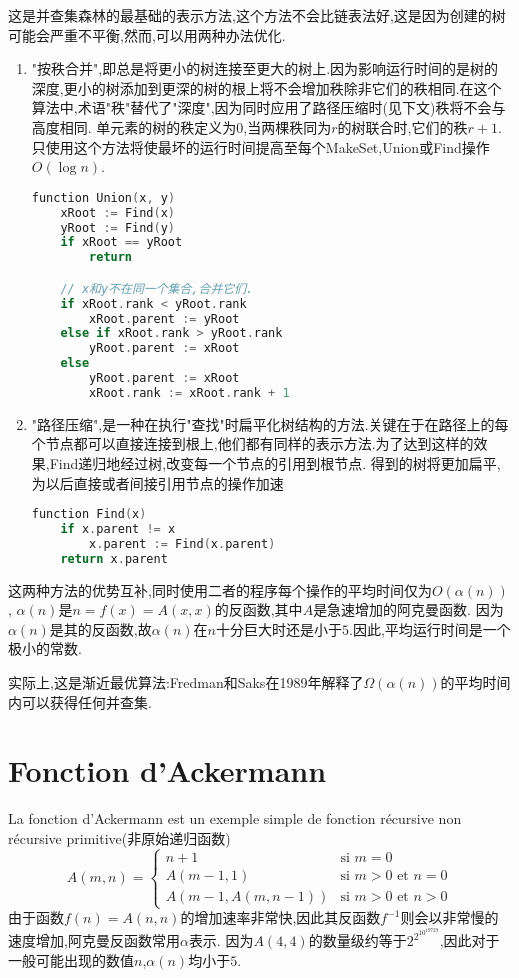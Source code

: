 这是并查集森林的最基础的表示方法,这个方法不会比链表法好,这是因为创建的树可能会严重不平衡,然而,可以用两种办法优化.
\begin{enumerate}
\item "按秩合并",即总是将更小的树连接至更大的树上.因为影响运行时间的是树的深度,更小的树添加到更深的树的根上将不会增加秩除非它们的秩相同.在这个算法中,术语"秩"替代了"深度",因为同时应用了路径压缩时(见下文)秩将不会与高度相同.
	单元素的树的秩定义为$0$,当两棵秩同为$r$的树联合时,它们的秩$r+1$.只使用这个方法将使最坏的运行时间提高至每个MakeSet,Union或Find操作 $O(\log n)$.
\begin{lstlisting}[language = C]
function Union(x, y)
	xRoot := Find(x)
	yRoot := Find(y)
	if xRoot == yRoot
		return

	// x和y不在同一个集合,合并它们.
	if xRoot.rank < yRoot.rank
		xRoot.parent := yRoot
	else if xRoot.rank > yRoot.rank
		yRoot.parent := xRoot
	else
		yRoot.parent := xRoot
		xRoot.rank := xRoot.rank + 1
\end{lstlisting}
\item "路径压缩",是一种在执行"查找"时扁平化树结构的方法.关键在于在路径上的每个节点都可以直接连接到根上,他们都有同样的表示方法.为了达到这样的效果,Find递归地经过树,改变每一个节点的引用到根节点.
	得到的树将更加扁平,为以后直接或者间接引用节点的操作加速
\begin{lstlisting}[language = C]
function Find(x)
	if x.parent != x
		x.parent := Find(x.parent)
	return x.parent
\end{lstlisting}
\end{enumerate}
这两种方法的优势互补,同时使用二者的程序每个操作的平均时间仅为$O(\alpha(n))$, $\alpha(n)$是$n = f(x) = A(x,x)$的反函数,其中$A$是急速增加的阿克曼函数.
因为$\alpha(n)$是其的反函数,故$\alpha(n)$在$n$十分巨大时还是小于$5$.因此,平均运行时间是一个极小的常数.

实际上,这是渐近最优算法:Fredman和Saks在1989年解释了$\Omega(\alpha(n))$的平均时间内可以获得任何并查集.

\section{Fonction d'Ackermann}
La fonction d'Ackermann est un exemple simple de fonction r\'ecursive non r\'ecursive primitive(非原始递归函数)
$$
A(m,n) =
\begin{cases}
	n + 1 & {\mbox{si }} m = 0 \\
	A(m-1, 1) & {\mbox{si }} m > 0{\mbox{ et }}n = 0 \\
	A(m-1, A(m, n-1)) & {\mbox{si }} m > 0{\mbox{ et }}n > 0
\end{cases}
$$
由于函数$f(n)=A(n,n)$的增加速率非常快,因此其反函数$f^{−1}$则会以非常慢的速度增加,阿克曼反函数常用$\alpha$表示.
因为$A(4,4)$的数量级约等于$2^{{2^{{10^{{19729}}}}}}$,因此对于一般可能出现的数值$n$,$\alpha(n)$均小于$5$.

